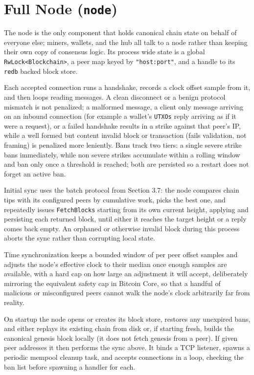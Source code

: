 \documentclass[11pt]{article}
\newcommand{\code}[1]{\texttt{#1}}
\begin{document}
\section{Full Node (\code{node})}
\label{sec:node}

The node is the only component that holds canonical chain state on behalf of everyone else; miners, wallets, and the hub all talk to a node rather than keeping their own copy of consensus logic. Its process wide state is a global \code{RwLock<Blockchain>}, a peer map keyed by \code{"host:port"}, and a handle to its \code{redb} backed block store.

Each accepted connection runs a handshake, records a clock offset sample from it, and then loops reading messages. A clean disconnect or a benign protocol mismatch is not penalized; a malformed message, a client only message arriving on an inbound connection (for example a wallet's \code{UTXOs} reply arriving as if it were a request), or a failed handshake results in a strike against that peer's IP, while a well formed but content invalid block or transaction (fails validation, not framing) is penalized more leniently. Bans track two tiers: a single severe strike bans immediately, while non severe strikes accumulate within a rolling window and ban only once a threshold is reached; both are persisted so a restart does not forget an active ban.

Initial sync uses the batch protocol from Section 3.7: the node compares chain tips with its configured peers by cumulative work, picks the best one, and repeatedly issues \code{FetchBlocks} starting from its own current height, applying and persisting each returned block, until either it reaches the target height or a reply comes back empty. An orphaned or otherwise invalid block during this process aborts the sync rather than corrupting local state.

Time synchronization keeps a bounded window of per peer offset samples and adjusts the node's effective clock to their median once enough samples are available, with a hard cap on how large an adjustment it will accept, deliberately mirroring the equivalent safety cap in Bitcoin Core, so that a handful of malicious or misconfigured peers cannot walk the node's clock arbitrarily far from reality.

On startup the node opens or creates its block store, restores any unexpired bans, and either replays its existing chain from disk or, if starting fresh, builds the canonical genesis block locally (it does not fetch genesis from a peer). If given peer addresses it then performs the sync above. It binds a TCP listener, spawns a periodic mempool cleanup task, and accepts connections in a loop, checking the ban list before spawning a handler for each.
\end{document}

